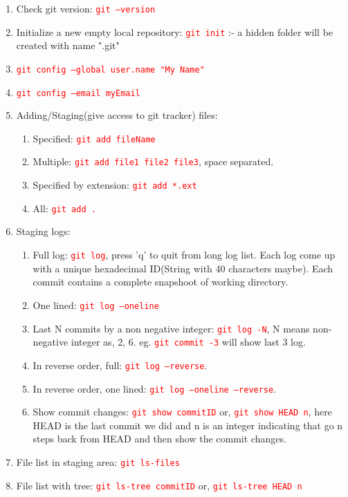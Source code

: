 \documentclass[10 pt]{article}
\newcommand{\R}{\textcolor{red}} %
\newcommand{\T}{\texttt}
\begin{document}
\begin{enumerate}
	\item Check git version: \R{\T{git --version}}
	\item Initialize a new empty local repository: \R{\T{git init}} :- a hidden folder will be created with name ".git"
	\item \R{\T{git config --global user.name "My Name"}}
	\item \R{\T{git config --email myEmail}}
	\item Adding/Staging(give access to git tracker) files:
		\begin{enumerate}
			\item Specified: \R{\T{git add fileName}}
			\item Multiple: \R{\T{git add file1 file2 file3}}, space separated.
			\item Specified by extension: \R{\T{git add *.ext}}
			\item All: \R{\T{git add .}}
		\end{enumerate}
	\item Staging logs:
		\begin{enumerate}
			\item Full log: \R{\T{git log}}, press 'q' to quit from long log list. Each log come up with a unique hexadecimal ID(String with 40 characters maybe). Each commit contains a complete snapshoot of working directory.
			\item One lined: \R{\T{git log --oneline}}
			\item Last N commits by a non negative integer: \R{\T{git log -N}}, N means non-negative integer as, 2, 6. eg. \R{\T{git commit -3}} will show last 3 log.
			\item In reverse order, full: \R{\T{git log --reverse}}.
			\item In reverse order, one lined: \R{\T{git log --oneline --reverse}}.
			\item Show commit changes: \R{\T{git show commitID}} or, \R{\T{git show HEAD~n}}, here HEAD is the last commit we did and n is an integer indicating that go n steps back from HEAD and then show the commit changes.
		\end{enumerate}
	\item File list in staging area: \R{\T{git ls-files}}
	\item File list with tree: \R{\T{git ls-tree commitID}}	or, \R{\T{git ls-tree HEAD~n}}
	

\end{enumerate}
\end{document}
